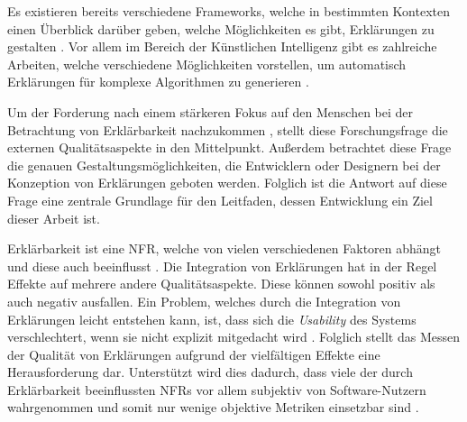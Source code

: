 \smallskip

\noindent{}

\smallskip

Es existieren bereits verschiedene Frameworks, welche in bestimmten Kontexten einen Überblick darüber geben, welche Möglichkeiten es gibt, Erklärungen zu gestalten \cite{nunes_systematic_2017}. Vor allem im Bereich der Künstlichen Intelligenz gibt es zahlreiche Arbeiten, welche verschiedene Möglichkeiten vorstellen, um automatisch Erklärungen für komplexe Algorithmen zu generieren \cite{sokol_explainability_2020, mahoney2019framework}.

Um der Forderung nach einem stärkeren Fokus auf den Menschen bei der Betrachtung von Erklärbarkeit nachzukommen \cite{ehsan_operationalizing_2021}, stellt diese Forschungsfrage die externen Qualitätsaspekte \cite{international2011iso} in den Mittelpunkt. Außerdem betrachtet diese Frage die genauen Gestaltungsmöglichkeiten, die Entwicklern oder Designern bei der Konzeption von Erklärungen geboten werden. Folglich ist die Antwort auf diese Frage eine zentrale Grundlage für den Leitfaden, dessen Entwicklung ein Ziel dieser Arbeit ist.

\smallskip

\noindent{}

\smallskip

Erklärbarkeit ist eine NFR, welche von vielen verschiedenen Faktoren abhängt und diese auch beeinflusst \cite{chazette_knowledge_nodate}. Die Integration von Erklärungen hat in der Regel Effekte auf mehrere andere Qualitätsaspekte. Diese können sowohl positiv als auch negativ ausfallen. Ein Problem, welches durch die Integration von Erklärungen leicht entstehen kann, ist, dass sich die \textit{Usability} des Systems verschlechtert, wenn sie nicht explizit mitgedacht wird \cite{sokol_explainability_2020}. Folglich stellt das Messen der Qualität von Erklärungen aufgrund der vielfältigen Effekte eine Herausforderung dar. Unterstützt wird dies dadurch, dass viele der durch Erklärbarkeit beeinflussten NFRs vor allem subjektiv von Software-Nutzern wahrgenommen und somit nur wenige objektive Metriken einsetzbar sind \cite{sokol_explainability_2020}.

